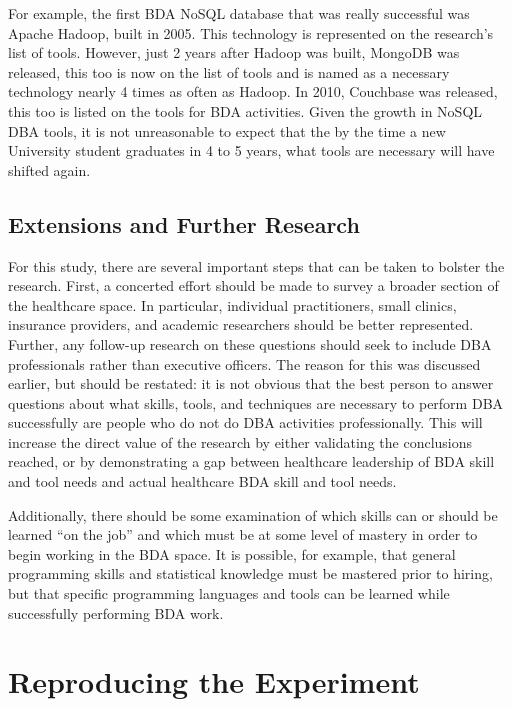 For example, the first BDA NoSQL database that was really successful was Apache Hadoop, built in 2005. This technology is represented on the research's list of tools. However, just 2 years after Hadoop was built, MongoDB was released, this too is now on the list of tools and is named as a necessary technology nearly 4 times as often as Hadoop. In 2010, Couchbase was released, this too is listed on the tools for BDA activities. Given the growth in NoSQL DBA tools, it is not unreasonable to expect that the by the time a new University student graduates in 4 to 5 years, what tools are necessary will have shifted again.

\subsection{Extensions and Further Research}

For this study, there are several important steps that can be taken to bolster the research. First, a concerted effort should be made to survey a broader section of the healthcare space. In particular, individual practitioners, small clinics, insurance providers, and academic researchers should be better represented. Further, any follow-up research on these questions should seek to include DBA professionals rather than executive officers. The reason for this was discussed earlier, but should be restated: it is not obvious that the best person to answer questions about what skills, tools, and techniques are necessary to perform DBA successfully are people who do not do DBA activities professionally. This will increase the direct value of the research by either validating the conclusions reached, or by demonstrating a gap between healthcare leadership of BDA skill and tool needs and actual healthcare BDA skill and tool needs.

Additionally, there should be some examination of which skills can or should be learned ``on the job'' and which must be at some level of mastery in order to begin working in the BDA space. It is possible, for example, that general programming skills and statistical knowledge must be mastered prior to hiring, but that specific programming languages and tools can be learned while successfully performing BDA work.

\section{Reproducing the Experiment}

